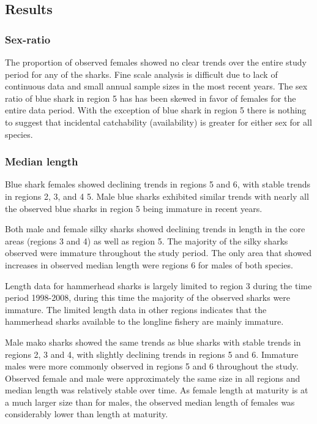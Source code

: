 \documentclass[12pt]{SCreport}
\begin{document}
% 
\subsection{Results}
\subsubsection{Sex-ratio}
    The proportion of observed females showed no clear trends over the entire study period for any of the sharks.  Fine scale analysis is difficult due to lack of continuous data and small annual sample sizes in the most recent years.   The sex ratio of blue shark in region 5 has has been skewed in favor of females for the entire data period. With the exception of blue shark in region 5 there is nothing to suggest that incidental catchability (availability) is greater for either sex for all species.
    
\subsubsection{Median length}
Blue shark females showed declining trends in regions 5 and 6, with stable trends in regions 2, 3, and 4 5. Male blue sharks exhibited similar trends with nearly all the observed blue sharks in region 5 being immature in recent years. 

Both male and female silky sharks showed declining trends in length in the core areas (regions 3 and 4) as well as region 5.  The majority of the silky sharks observed were immature throughout the study period. The only area  that showed increases in observed median length were regions 6 for males of both species. 

Length data for hammerhead sharks is largely limited to region 3 during the time period 1998-2008, during this time the majority of the observed sharks were immature. The limited length data in other regions indicates that the hammerhead sharks available to the longline fishery are mainly immature.

Male mako sharks showed the same trends as blue sharks with stable trends in regions 2, 3 and 4, with slightly declining trends in regions 5 and 6. Immature males were more commonly observed in regions 5 and 6 throughout the study.  Observed female and male were approximately the same size in all regions and median length was relatively stable over time.  As female length at maturity is at a much larger size than for males, the observed median length of females was considerably lower than length at maturity.
\end{document}
